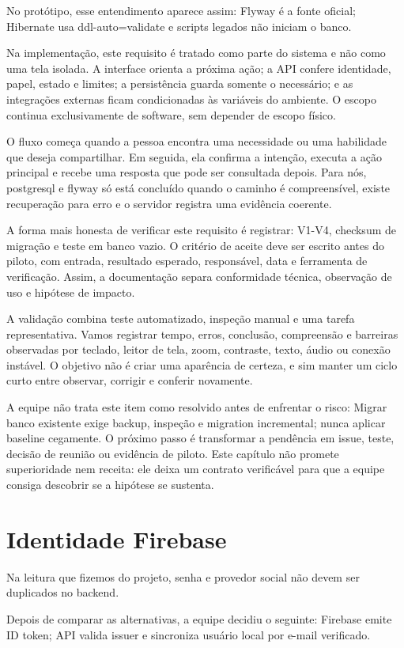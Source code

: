 \documentclass[12pt,oneside,a4paper,article]{abntex2}
\begin{document}
No protótipo, esse entendimento aparece assim: Flyway é a fonte oficial; Hibernate usa ddl-auto=validate e scripts legados não iniciam o banco.

Na implementação, este requisito é tratado como parte do sistema e não como uma tela isolada. A interface orienta a próxima ação; a API confere identidade, papel, estado e limites; a persistência guarda somente o necessário; e as integrações externas ficam condicionadas às variáveis do ambiente. O escopo continua exclusivamente de software, sem depender de escopo físico.

O fluxo começa quando a pessoa encontra uma necessidade ou uma habilidade que deseja compartilhar. Em seguida, ela confirma a intenção, executa a ação principal e recebe uma resposta que pode ser consultada depois. Para nós, postgresql e flyway só está concluído quando o caminho é compreensível, existe recuperação para erro e o servidor registra uma evidência coerente.

A forma mais honesta de verificar este requisito é registrar: V1-V4, checksum de migração e teste em banco vazio. O critério de aceite deve ser escrito antes do piloto, com entrada, resultado esperado, responsável, data e ferramenta de verificação. Assim, a documentação separa conformidade técnica, observação de uso e hipótese de impacto.

A validação combina teste automatizado, inspeção manual e uma tarefa representativa. Vamos registrar tempo, erros, conclusão, compreensão e barreiras observadas por teclado, leitor de tela, zoom, contraste, texto, áudio ou conexão instável. O objetivo não é criar uma aparência de certeza, e sim manter um ciclo curto entre observar, corrigir e conferir novamente.

A equipe não trata este item como resolvido antes de enfrentar o risco: Migrar banco existente exige backup, inspeção e migration incremental; nunca aplicar baseline cegamente. O próximo passo é transformar a pendência em issue, teste, decisão de reunião ou evidência de piloto. Este capítulo não promete superioridade nem receita: ele deixa um contrato verificável para que a equipe consiga descobrir se a hipótese se sustenta.

\section{Identidade Firebase}
Na leitura que fizemos do projeto, senha e provedor social não devem ser duplicados no backend.

Depois de comparar as alternativas, a equipe decidiu o seguinte: Firebase emite ID token; API valida issuer e sincroniza usuário local por e-mail verificado.
\end{document}
